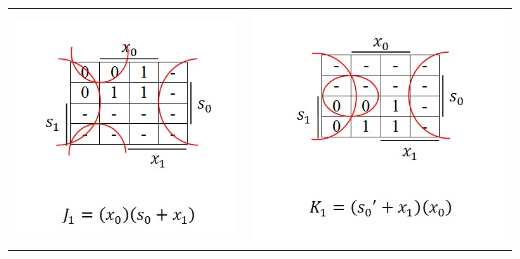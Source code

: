 \documentclass{article}
\begin{document}
\begin{table}[h!]
\begin{tabular}{ c c }
\centering
\includegraphics[scale=0.6]{J1-KMap} &
\includegraphics[scale=0.6]{K1-KMap} \\
\end{tabular}
\end{table}
\end{document}
